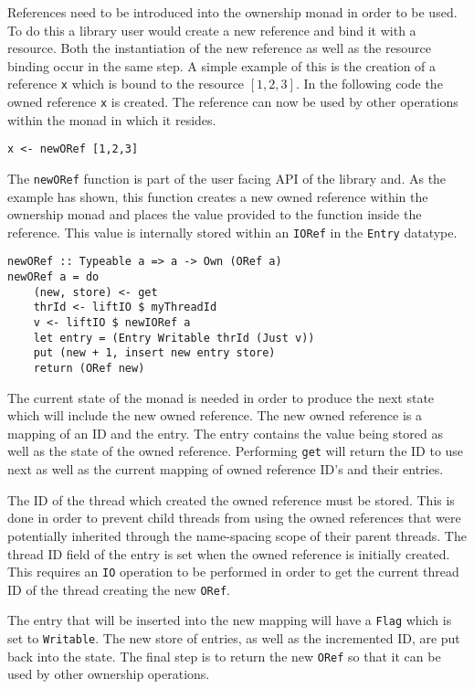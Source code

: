 \documentclass[onehalf,11pt]{beavtex}
\begin{document}
References need to be introduced into the ownership monad in order to be used.
To do this a library user would create a new reference and bind it with a
resource.
Both the instantiation of the new reference as well as the resource binding
occur in the same step.
A simple example of this is the creation of a reference \texttt{x} which is
bound to the resource $\left[1,2,3\right]$.
In the following code the owned reference \texttt{x} is created.
The reference can now be used by other operations within the monad in which
it resides.

\begin{verbatim}
x <- newORef [1,2,3]
\end{verbatim}

The \texttt{newORef} function is part of the user facing API of the library
and. As the example has shown, this function creates a new owned reference
within the ownership monad and places the value provided to the function
inside the reference. This value is internally stored within an \texttt{IORef}
in the \texttt{Entry} datatype.

\begin{verbatim}
newORef :: Typeable a => a -> Own (ORef a)
newORef a = do
    (new, store) <- get
    thrId <- liftIO $ myThreadId
    v <- liftIO $ newIORef a
    let entry = (Entry Writable thrId (Just v))
    put (new + 1, insert new entry store)
    return (ORef new)
\end{verbatim}

The current state of the monad is needed in order to produce the next state
which will include the new owned reference.
The new owned reference is a mapping of an ID and the entry. The entry
contains the value being stored as well as the state of the owned reference.
Performing \texttt{get} will return the ID to use next as well as the current
mapping of owned reference ID's and their entries.

The ID of the thread which created the owned reference must be stored.
This is done in order to prevent child threads from using the owned
references that were potentially inherited through the name-spacing scope of
their parent threads.  The thread ID field of the entry is set when the owned
reference is initially created. This requires an \texttt{IO} operation to be
performed in order to get the current thread ID of the thread creating the
new \texttt{ORef}.

The entry that will be inserted into the new mapping will have a \texttt{Flag}
which is set to \texttt{Writable}.
The new store of entries, as well as the incremented ID, are put back into the
state.
The final step is to return the new \texttt{ORef} so that it can be used by other
ownership operations.
\end{document}
